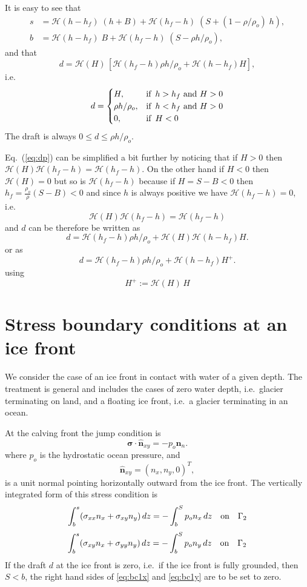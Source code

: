 \documentclass[10pt,a4paper]{book}
\newcommand{\He}{\mathcal{H}}
\newcommand{\sxx}{\sigma_{xx}}
\newcommand{\sxy}{\sigma_{xy}}
\newcommand{\syy}{\sigma_{yy}}
\newcommand{\normal}{\hat{\bm{n}}}
\begin{document}
It is easy to see that
\begin{align}
s&= \He(h-h_f) \; (h+ B) + \He(h_f-h) \; (S+(1-\rho/\rho_o)\; h ) ,\label{eq:sh} \\
b&=\He(h-h_f) \; B + \He(h_f-h) \; (S-\rho h/\rho_o), \label{eq:bh}
\end{align}
and that
\begin{equation}
d= \He(H) \, [ \He(h_f-h) \rho h/\rho_o + \He(h-h_f) H ] ,
\label{eq:dp}
\end{equation}
i.e.\ 
\[
d=\begin{cases} 
H , & \mbox{if } \, h>h_f \mbox{ and } H>0 \\  
\rho h /\rho_o , & \hbox{if } \,  h<h_f \mbox{ and } H>0\\
0 , & \hbox{if } \,  H<0  \
\end{cases}
\]
The draft is always $0\le d \le \rho h /\rho_o $.

Eq.~(\ref{eq:dp}) can be simplified a bit further by noticing that 
if $H>0$ then $\He(H) \He(h_f-h)=\He(h_f-h)$. On the other
hand if $H<0$ then $\He(H)=0$ but so is $\He(h_f-h)$ because if $H=S-B<0$ then 
$h_f=\frac{\rho_o}{\rho}(S-B) < 0$ and since $h$ is always positive we have
$\He(h_f-h)=0$, i.e.\
\[
\He(H) \He(h_f-h)=\He(h_f-h)
\]
and $d$ can be therefore be written as
\begin{equation}
d=  \He(h_f-h) \rho h/\rho_o + \He(H) \He(h-h_f) H .
\label{eq:dp2}
\end{equation}
or as
\begin{equation}
d=  \He(h_f-h) \rho h/\rho_o + \He(h-h_f) H^{+} .
\label{eq:dp3}
\end{equation}
using
\[
H^{+}:= \He(H) \, H
\]





\section{Stress boundary conditions at an ice front}

We consider the case of an ice front in contact with water of a given
depth. The treatment is general and includes the cases of zero water
depth, i.e.\ glacier terminating on land, and a floating ice front,
i.e.\ a glacier terminating in an ocean.


\label{sec:bccalving}
At the calving front the jump condition is
\[\bm{\sigma} \cdot \normal_{xy}= -p_o \normal_n .\]
where $p_o$ is the hydrostatic ocean pressure, and
\[
\normal_{xy}=(n_x,n_y,0)^T ,
\] 
is a unit normal pointing horizontally
outward from the ice front.  The vertically integrated form of this stress condition  is
\begin{equation}
 \int_b^s ( \sxx n_x + \sxy n_y) \, dz = -\int_b^S  p_o n_x \, dz  \quad \hbox{on} \quad \Gamma_2 
\label{eq:bc1x}
\end{equation}
\begin{equation} \int_b^s (\sxy n_x + \syy n_y) \, dz = -\int_b^S p_o n_y \, dz \quad \hbox{on} \quad \Gamma_2 
\label{eq:bc1y}
\end{equation}
If the draft $d$ at the ice front is zero,
i.e.\ if the ice front is fully grounded, then $S<b$, the right hand
sides of \eqref{eq:bc1x} and \eqref{eq:bc1y} are to be set to zero.
\end{document}
